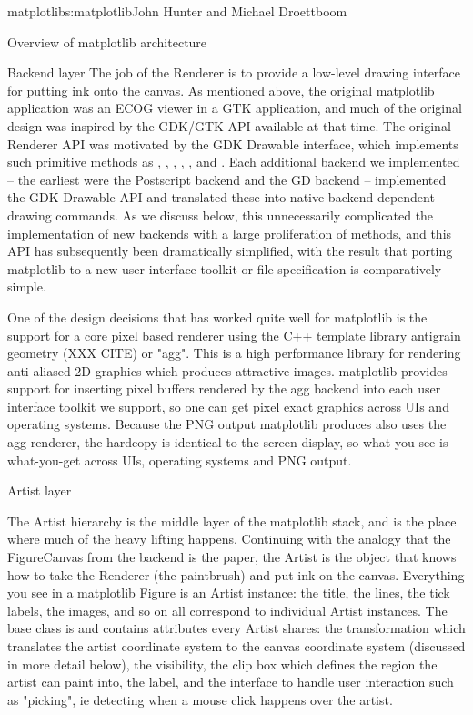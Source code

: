 \begin{aosachapter}{matplotlib}{s:matplotlib}{John Hunter and Michael Droettboom}
\begin{aosasect1}{Overview of matplotlib architecture}
\begin{aosasect2}{Backend layer}
The job of the Renderer is to provide a low-level drawing interface
for putting ink onto the canvas.  As mentioned above, the original
matplotlib application was an ECOG viewer in a GTK application, and
much of the original design was inspired by the GDK/GTK API available
at that time.  The original Renderer API was motivated by the GDK
Drawable interface, which implements such primitive methods as
, , ,
, , and .  Each
additional backend we implemented -- the earliest were the Postscript
backend and the GD backend -- implemented the GDK Drawable API and
translated these into native backend dependent drawing commands.  As
we discuss below, this unnecessarily complicated the implementation of
new backends with a large proliferation of methods, and this API has
subsequently been dramatically simplified, with the result that
porting matplotlib to a new user interface toolkit or file
specification is comparatively simple.

One of the design decisions that has worked quite well for matplotlib
is the support for a core pixel based renderer using the C++ template
library antigrain geometry (XXX CITE) or "agg".  This is a high
performance library for rendering anti-aliased 2D graphics which
produces attractive images.  matplotlib provides support for inserting
pixel buffers rendered by the agg backend into each user interface
toolkit we support, so one can get pixel exact graphics across UIs and
operating systems.  Because the PNG output matplotlib produces also
uses the agg renderer, the hardcopy is identical to the screen
display, so what-you-see is what-you-get across UIs, operating systems
and PNG output.

\end{aosasect2}

\begin{aosasect2}{Artist layer}

The Artist hierarchy is the middle layer of the matplotlib stack, and
is the place where much of the heavy lifting happens.  Continuing with
the analogy that the FigureCanvas from the backend is the paper, the
Artist is the object that knows how to take the Renderer (the
paintbrush) and put ink on the canvas.  Everything you see in a
matplotlib Figure is an Artist instance: the title, the lines, the
tick labels, the images, and so on all correspond to individual Artist
instances.  The base class is  and
contains attributes every Artist shares: the transformation which
translates the artist coordinate system to the canvas coordinate
system (discussed in more detail below), the visibility, the clip box
which defines the region the artist can paint into, the label, and the
interface to handle user interaction such as "picking", ie detecting
when a mouse click happens over the artist.


\end{aosasect2}
\end{aosasect1}
\end{aosachapter}
